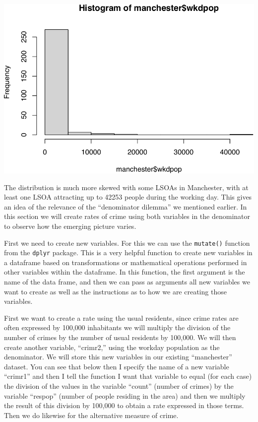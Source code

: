 \documentclass[
  krantz2]{krantz}
\makeatletter
\newenvironment{Shaded}{\begin{snugshade}}{\end{snugshade}}
\newcommand{\FunctionTok}[1]{\textcolor[rgb]{0,0,0}{#1}}
\newcommand{\NormalTok}[1]{#1}
\newcommand{\SpecialCharTok}[1]{\textcolor[rgb]{0,0,0}{#1}}
\newenvironment{kframe}{%
\medskip{}
\setlength{\fboxsep}{.8em}
 \def\at@end@of@kframe{}%
 \ifinner\ifhmode%
  \def\at@end@of@kframe{\end{minipage}}%
  \begin{minipage}{\columnwidth}%
 \fi\fi%
 \def\FrameCommand##1{\hskip\@totalleftmargin \hskip-\fboxsep
 \colorbox{shadecolor}{##1}\hskip-\fboxsep
     \hskip-\linewidth \hskip-\@totalleftmargin \hskip\columnwidth}%
 \MakeFramed {\advance\hsize-\width
   \@totalleftmargin\z@ \linewidth\hsize
   \@setminipage}}%
 {\par\unskip\endMakeFramed%
 \at@end@of@kframe}
\renewenvironment{Shaded}{\begin{kframe}}{\end{kframe}}
\makeatother
\begin{document}
\begin{Shaded}
\end{Shaded}

\includegraphics{crime_mapping_files/figure-latex/unnamed-chunk-82-1.pdf}

The distribution is much more skewed with some LSOAs in Manchester, with at least one LSOA attracting up to 42253 people during the working day. This gives an idea of the relevance of the ``denominator dilemma'' we mentioned earlier. In this section we will create rates of crime using both variables in the denominator to observe how the emerging picture varies.

First we need to create new variables. For this we can use the \texttt{mutate()} function from the \texttt{dplyr} package. This is a very helpful function to create new variables in a dataframe based on transformations or mathematical operations performed in other variables within the dataframe. In this function, the first argument is the name of the data frame, and then we can pass as arguments all new variables we want to create as well as the instructions as to how we are creating those variables.

First we want to create a rate using the usual residents, since crime rates are often expressed by 100,000 inhabitants we will multiply the division of the number of crimes by the number of usual residents by 100,000. We will then create another variable, ``crimr2,'' using the workday population as the denominator. We will store this new variables in our existing ``manchester'' dataset. You can see that below then I specify the name of a new variable ``crimr1'' and then I tell the function I want that variable to equal (for each case) the division of the values in the variable ``count'' (number of crimes) by the variable ``respop'' (number of people residing in the area) and then we multiply the result of this division by 100,000 to obtain a rate expressed in those terms. Then we do likewise for the alternative measure of crime.
\end{document}

